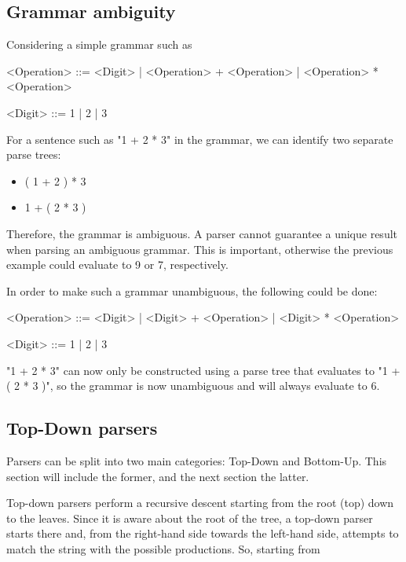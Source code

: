 \subsection{Grammar ambiguity}

Considering a simple grammar such as 

\begin{grammar}
<Operation> ::= <Digit> | <Operation> + <Operation> | <Operation> * <Operation> 

<Digit> ::= 1 | 2 | 3 
\end{grammar}

For a sentence such as "1 + 2 * 3" in the grammar, we can identify two separate parse trees:
\begin{itemize}
    \item ( 1 + 2 ) * 3 
    \item 1 + ( 2 * 3 )
\end{itemize}

Therefore, the grammar is ambiguous. A parser cannot guarantee a unique result when parsing an ambiguous grammar. \cite[p. 121]{craftingCompiler} This is important, otherwise the previous example could evaluate to 9 or 7, respectively.
\par
In order to make such a grammar unambiguous, the following could be done:

\begin{grammar}
<Operation> ::= <Digit> | <Digit> + <Operation> | <Digit> * <Operation> 

<Digit> ::= 1 | 2 | 3 
\end{grammar}

"1 + 2 * 3" can now only be constructed using a parse tree that evaluates to "1 + ( 2 * 3 )", so the grammar is now unambiguous and will always evaluate to 6.

\subsection{Top-Down parsers}

Parsers can be split into two main categories: Top-Down and Bottom-Up. This section will include the former, and the next section the latter.

Top-down parsers perform a recursive descent starting from the root (top) down to the leaves. Since it is aware about the root of the tree, a top-down parser starts there and, from the right-hand side towards the left-hand side, attempts to match the string with the possible productions. So, starting from

